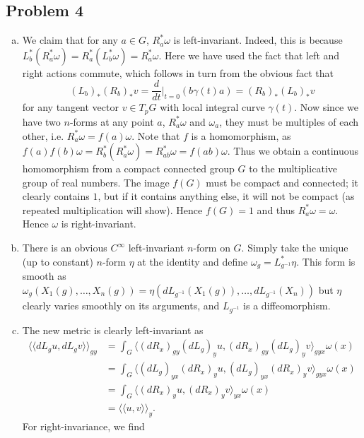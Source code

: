 \documentclass{../mathnotes}
\begin{document}
\subsection*{Problem 4}
\begin{enumerate}[(a)]
    \item We claim that for any $a\in G$, $R_a^*\omega$ is left-invariant. Indeed, this is because
        $L_b^*(R_a^*\omega)=R_a^*(L_b^*\omega)=R_a^*\omega$. Here we have used the fact that left
        and right actions commute, which follows in turn from the obvious fact that
        \[(L_b)_*(R_b)_*v=\frac{d}{dt}\bigg|_{t=0}\left( b\gamma(t)a \right)=(R_b)_*(L_b)_*v\]
        for any tangent vector $v\in T_pG$ with local integral curve $\gamma(t)$. Now since we have
        two $n$-forms at any point $a$, $R^*_a\omega$ and $\omega_a$, they must be multiples of each
        other, i.e. $R^*_a\omega=f(a)\omega$. Note that $f$ is a homomorphism, as
        $f(a)f(b)\omega=R_b^*(R_a^*\omega)=R_{ab}^*\omega=f(ab)\omega$. Thus we obtain a continuous
        homomorphism from a compact connected group $G$ to the multiplicative group of real numbers.
        The image $f(G)$ must be compact and connected; it clearly contains $1$, but if it contains
        anything else, it will not be compact (as repeated multiplication will show). Hence $f(G)=1$
        and thus $R_a^*\omega=\omega$. Hence $\omega$ is right-invariant.
    \item There is an obvious $C^\infty$ left-invariant $n$-form on $G$. Simply take the unique
        (up to constant) $n$-form $\eta$ at the identity and define $\omega_g=L_{g^{-1}}^*\eta$. This form is
        smooth as $\omega_g(X_1(g),\ldots,X_n(g))=\eta( dL_{g^{-1}}(X_1(g)),\ldots,dL_{g^{-1}}(X_n))$ but $\eta$ clearly varies
        smoothly on its arguments, and $L_{g^{-1}}$ is a diffeomorphism.
    \item The new metric is clearly left-invariant as
        \begin{align*}
            \langle\langle dL_gu,dL_gv \rangle\rangle_{gy} &= \int_G \langle (dR_x)_{gy}(dL_g)_yu,(dR_x)_{gy}(dL_g)_yv\rangle_{gyx}\omega(x)\\
            &= \int_G \langle (dL_g)_{yx}(dR_x)_yu, (dL_g)_{yx}(dR_x)_yv\rangle_{gyx}\omega(x)\\
            &= \int_G \langle (dR_x)_yu, (dR_x)_yv\rangle_{yx}\omega(x)\\
            &= \langle\langle u,v\rangle\rangle_y.
        \end{align*}
        For right-invariance, we find

\end{enumerate}
\end{document}
